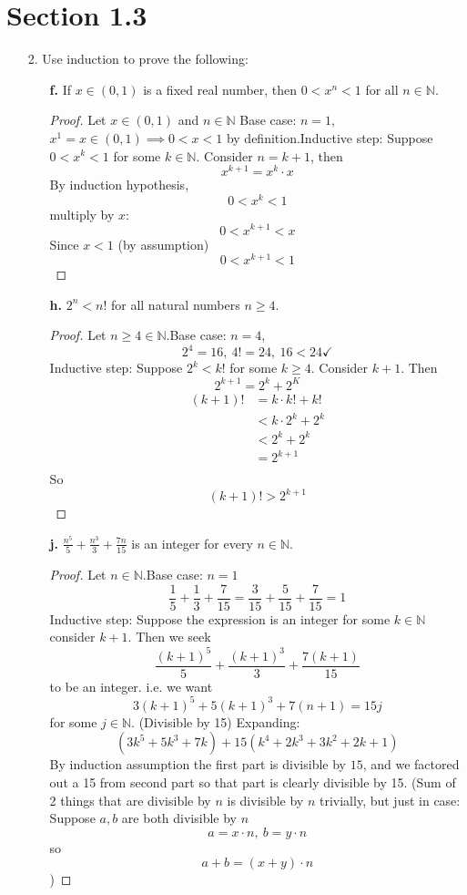 \documentclass[hidelinks,12pt]{article}
\title{\scalebox{2}{Math 523 Homework 1}}
\author{\scalebox{1.5}{Theo Koss}}
\date{September 2023}
\renewcommand{\geq}{\geqslant}
\newcommand{\N}{\mathbb{N}}
\begin{document}
\maketitle

\section*{Section 1.3}
\begin{itemize}
    \item[2.] Use induction to prove the following:\begin{enumerate}
        \item[\bf{f.}] If $x\in(0, 1)$ is a fixed real number, then $0 <x^n < 1$ for all $n\in\N$.\begin{proof}
            Let $x\in(0,1)$ and $n\in\N$ \newline Base case: $n=1$, $x^1=x\in(0,1)\implies 0<x<1$ by definition.\newline Inductive step: Suppose $0<x^k<1$ for some $k\in\N$. Consider $n=k+1$, then $$x^{k+1}=x^k\cdot x$$ By induction hypothesis, $$0<x^k<1$$ multiply by $x$: $$0<x^{k+1}<x$$ Since $x<1$ (by assumption) $$0<x^{k+1}<1$$
        \end{proof}
        \item[\bf{h.}]$2^n<n!$ for all natural numbers $n\geq4$.\begin{proof}
            Let $n\geq4\in\N$.\newline Base case: $n=4$, $$2^4=16,\  4!=24,\  16<24 \checkmark$$
            Inductive step: Suppose $2^k<k!$ for some $k\geq4$. Consider $k+1$. Then $$2^{k+1}=2^k+2^K$$\begin{align*}
                (k+1)!&=k\cdot k!+k!\\
                &<k\cdot2^k+2^k\tag{By hypothesis}\\
                &<2^k+2^k\\
                &=2^{k+1}\\
            \end{align*}So $$(k+1)!>2^{k+1}$$
        \end{proof}
        \item[\bf{j.}] $\frac{n^5}{5}+\frac{n^3}{3}+\frac{7n}{15}$ is an integer for every $n\in\N$.\begin{proof}
            Let $n\in\N$.\newline Base case: $n=1$ $$\frac{1}{5}+\frac{1}{3}+\frac{7}{15}=\frac{3}{15}+\frac{5}{15}+\frac{7}{15}=1$$ Inductive step: Suppose the expression is an integer for some $k\in\N$ consider $k+1$. Then we seek $$\frac{(k+1)^5}{5}+\frac{(k+1)^3}{3}+\frac{7(k+1)}{15}$$ to be an integer. i.e. we want $$3(k+1)^5+5(k+1)^3+7(n+1)=15j$$ for some $j\in\N$. (Divisible by 15) \newline Expanding: $$(3k^5+5k^3+7k)+15(k^4+2k^3+3k^2+2k+1)$$ By induction assumption the first part is divisible by $15$, and we factored out a 15 from second part so that part is clearly divisible by 15. (Sum of 2 things that are divisible by $n$ is divisible by $n$ trivially, but just in case: Suppose $a,b$ are both divisible by $n$ $$a=x\cdot n,\ b=y\cdot n$$ so $$a+b=(x+y)\cdot n$$)

\end{proof}
\end{enumerate}
\end{itemize}
\end{document}
